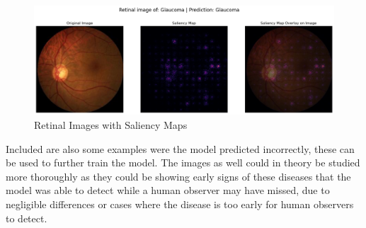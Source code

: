 \documentclass[sigconf]{acmart}
\begin{document}
\begin{figure}[]
  \centering
  \includegraphics[width=\linewidth]{samples/resources/saliency maps/retinal_glaucoma.png}
  \caption{Retinal Images with Saliency Maps}
\end{figure}

Included are also some examples were the model predicted incorrectly, these can be used to further train the model. The images as well could in theory be studied more thoroughly as they could be showing early signs of these diseases that the model was able to detect while a human observer may have missed, due to negligible differences or cases where the disease is too early for human observers to detect.
\end{document}
